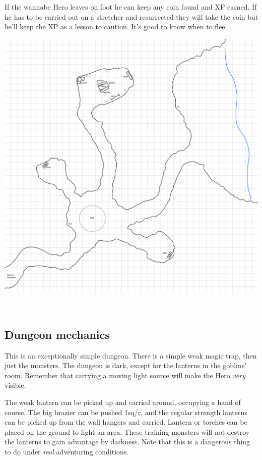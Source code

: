 \noindent
If the wannabe Hero leaves on foot he can keep any coin found and XP earned. If he has to be carried out on a stretcher and resurrected they will take the coin but he'll keep the XP as a lesson to caution. It's good to know when to flee.




\clearpage %

\noindent
%
\includegraphics[width=0.999\textwidth]{./map/cave.png}

\


\subsection*{Dungeon mechanics}

This is an exceptionally simple dungeon. There is a simple weak magic trap, then just the monsters. The dungeon is dark, except for the lanterns in the goblins' room. Remember that carrying a moving light source will make the Hero \emph{very} visible.

The weak lantern can be picked up and carried around, occupying a hand of course. The big brazier can be pushed 1sq/r, and the regular strength lanterns can be picked up from the wall hangers and carried. Lantern or torches can be placed on the ground to light an area. These training monsters will not destroy the lanterns to gain advantage by darkness. Note that this is a dangerous thing to do under \emph{real} adventuring conditions.

